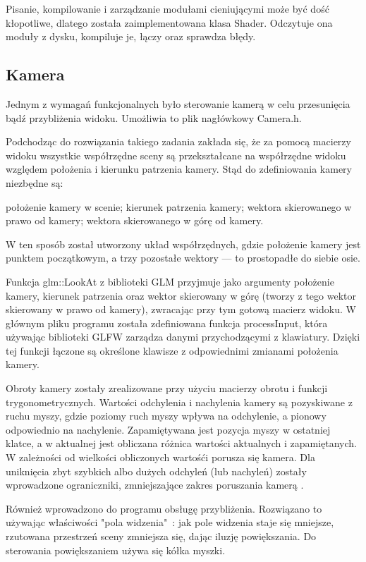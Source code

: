 Pisanie, kompilowanie i zarządzanie modułami cieniującymi może być dość kłopotliwe, dlatego została zaimplementowana klasa Shader. Odczytuje ona moduły z dysku, kompiluje je, łączy oraz sprawdza błędy. 

\subsection{Kamera}
Jednym z wymagań funkcjonalnych było sterowanie kamerą w celu przesunięcia bądź przybliżenia widoku. Umożliwia to plik nagłówkowy Camera.h.

Podchodząc do rozwiązania takiego zadania zakłada się, że za pomocą macierzy widoku wszystkie współrzędne sceny są przekształcane na współrzędne widoku względem położenia i kierunku patrzenia kamery. Stąd do zdefiniowania kamery niezbędne są: 
\begin{itemize}
\itemi położenie kamery w scenie;
\itemi kierunek patrzenia kamery;
\itemi wektora skierowanego w prawo od kamery;
\itemi wektora skierowanego w górę od kamery.
\end{itemize}
W ten sposób został utworzony układ współrzędnych, gdzie położenie kamery jest punktem początkowym, a trzy pozostałe wektory --- to prostopadłe do siebie osie. 

Funkcja glm::LookAt z biblioteki GLM przyjmuje jako argumenty położenie kamery, kierunek patrzenia oraz wektor skierowany w górę (tworzy z tego wektor skierowany w prawo od kamery), zwracając przy tym gotową macierz widoku. W głównym pliku programu została zdefiniowana funkcja processInput, która używając biblioteki GLFW zarządza danymi przychodzącymi z klawiatury. Dzięki tej funkcji łączone są określone klawisze z odpowiednimi zmianami położenia kamery.

Obroty kamery zostały zrealizowane przy użyciu macierzy obrotu i funkcji trygonometrycznych. Wartości odchylenia i nachylenia kamery są pozyskiwane z ruchu myszy, gdzie poziomy ruch myszy wpływa na odchylenie, a pionowy odpowiednio na nachylenie. Zapamiętywana jest pozycja myszy w ostatniej klatce, a w aktualnej jest obliczana różnica wartości aktualnych i zapamiętanych. W zależności od wielkości obliczonych wartośći porusza się kamera. Dla uniknięcia zbyt szybkich albo dużych odchyleń (lub nachyleń) zostały wprowadzone ograniczniki, zmniejszające zakres poruszania kamerą \cite{learnopengl}. 

Również wprowadzono do programu obsługę przybliżenia. Rozwiązano to używając właściwości "pola widzenia"\ : jak pole widzenia staje się mniejsze, rzutowana przestrzeń sceny zmniejsza się, dając iluzję powiększania. Do sterowania powiększaniem używa się kółka myszki.

